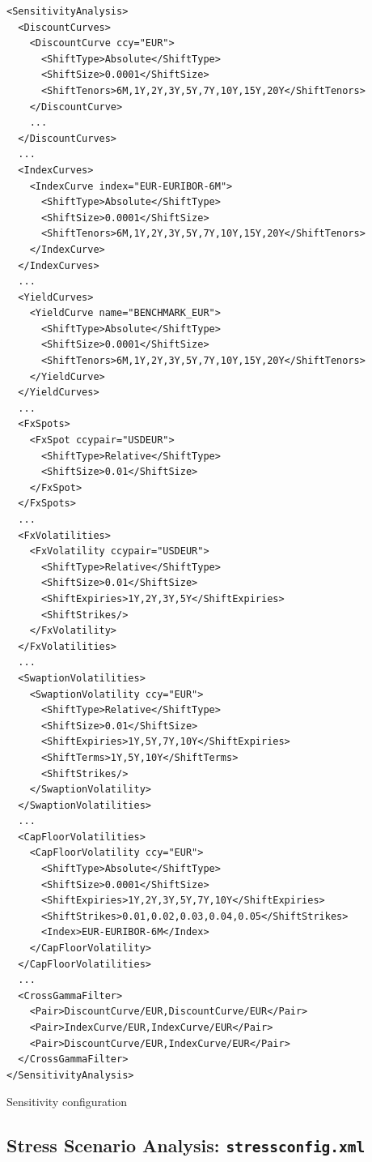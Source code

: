 \documentclass[12pt, a4paper]{article}
\newenvironment{longlisting}{\captionsetup{type=listing}}{}
\begin{document}
\begin{longlisting}
  \begin{verbatim}
<SensitivityAnalysis>
  <DiscountCurves>
    <DiscountCurve ccy="EUR">
      <ShiftType>Absolute</ShiftType>
      <ShiftSize>0.0001</ShiftSize>
      <ShiftTenors>6M,1Y,2Y,3Y,5Y,7Y,10Y,15Y,20Y</ShiftTenors>
    </DiscountCurve>
    ...
  </DiscountCurves>
  ...
  <IndexCurves>
    <IndexCurve index="EUR-EURIBOR-6M">
      <ShiftType>Absolute</ShiftType>
      <ShiftSize>0.0001</ShiftSize>
      <ShiftTenors>6M,1Y,2Y,3Y,5Y,7Y,10Y,15Y,20Y</ShiftTenors>
    </IndexCurve>
  </IndexCurves>
  ...
  <YieldCurves>
    <YieldCurve name="BENCHMARK_EUR">
      <ShiftType>Absolute</ShiftType>
      <ShiftSize>0.0001</ShiftSize>
      <ShiftTenors>6M,1Y,2Y,3Y,5Y,7Y,10Y,15Y,20Y</ShiftTenors>
    </YieldCurve>
  </YieldCurves>
  ...
  <FxSpots>
    <FxSpot ccypair="USDEUR">
      <ShiftType>Relative</ShiftType>
      <ShiftSize>0.01</ShiftSize>
    </FxSpot>
  </FxSpots>
  ...
  <FxVolatilities>
    <FxVolatility ccypair="USDEUR">
      <ShiftType>Relative</ShiftType>
      <ShiftSize>0.01</ShiftSize>
      <ShiftExpiries>1Y,2Y,3Y,5Y</ShiftExpiries>
      <ShiftStrikes/>
    </FxVolatility>
  </FxVolatilities>
  ...
  <SwaptionVolatilities>
    <SwaptionVolatility ccy="EUR">
      <ShiftType>Relative</ShiftType>
      <ShiftSize>0.01</ShiftSize>
      <ShiftExpiries>1Y,5Y,7Y,10Y</ShiftExpiries>
      <ShiftTerms>1Y,5Y,10Y</ShiftTerms>
      <ShiftStrikes/>
    </SwaptionVolatility>
  </SwaptionVolatilities>
  ...
  <CapFloorVolatilities>
    <CapFloorVolatility ccy="EUR">
      <ShiftType>Absolute</ShiftType>
      <ShiftSize>0.0001</ShiftSize>
      <ShiftExpiries>1Y,2Y,3Y,5Y,7Y,10Y</ShiftExpiries>
      <ShiftStrikes>0.01,0.02,0.03,0.04,0.05</ShiftStrikes>
      <Index>EUR-EURIBOR-6M</Index>
    </CapFloorVolatility>
  </CapFloorVolatilities>
  ...
  <CrossGammaFilter>
    <Pair>DiscountCurve/EUR,DiscountCurve/EUR</Pair>
    <Pair>IndexCurve/EUR,IndexCurve/EUR</Pair>
    <Pair>DiscountCurve/EUR,IndexCurve/EUR</Pair>
  </CrossGammaFilter>
</SensitivityAnalysis>
\end{verbatim}
\caption{Sensitivity configuration}
\label{lst:sensitivity_config}
\end{longlisting}

\subsection{Stress Scenario Analysis: {\tt stressconfig.xml}}\label{sec:stress}
\end{document}
